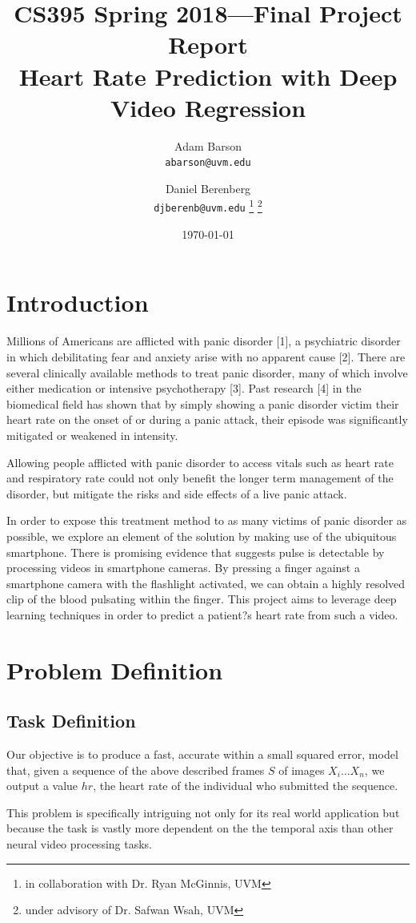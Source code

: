 \documentclass{article}
\title{CS395 Spring 2018---Final Project Report \\ \large Heart Rate Prediction with Deep Video Regression}
\author{
  Adam Barson \\ \small{\texttt{abarson@uvm.edu}}
  \and Daniel Berenberg \\ \small{\texttt{djberenb@uvm.edu}
  \thanks{in collaboration with Dr. Ryan McGinnis, UVM} 
 \thanks{under advisory of Dr. Safwan Wsah, UVM}}
}
\date{\today}
\begin{document}
\maketitle
\section[1]{Introduction}
\noindent Millions of Americans are afflicted with panic disorder [1], a psychiatric disorder in which debilitating fear and anxiety arise with no apparent cause [2]. There are several clinically available methods to treat panic disorder, many of which involve either medication or intensive psychotherapy [3]. Past research [4] in the biomedical field has shown that by simply showing a panic disorder victim their heart rate on the onset of or during a panic attack, their episode was significantly mitigated or weakened in intensity.

\noindent Allowing people afflicted with panic disorder to access vitals such as heart rate and respiratory rate could not only benefit the longer term management of the disorder, but mitigate the risks and side effects of a live panic attack.

\noindent In order to expose this treatment method to as many victims of panic disorder as possible, we explore an element of the solution by making use of the ubiquitous smartphone. There is promising evidence that suggests pulse is detectable by processing videos in smartphone cameras. By pressing a finger against a smartphone camera with the flashlight activated, we can obtain a highly resolved clip of the blood pulsating within the finger. This project aims to leverage deep learning techniques in order to predict a patient?s heart rate from such a video. 
\section[2]{Problem Definition}
\subsection[2.1]{Task Definition}
\noindent Our objective is to produce a fast, accurate within a small squared error, model that, given a sequence of the above described frames $S$ of images $X_{i} \ldots X_{n}$, we output a value $h{r}$, the heart rate of the individual who submitted the sequence. 

\noindent This problem is specifically intriguing not only for its real world application but because the task is vastly more dependent on the the temporal axis than other neural video processing tasks. 
\end{document}
